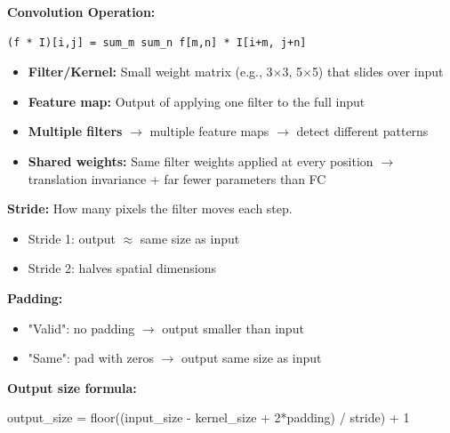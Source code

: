 \documentclass[11pt]{article}
\providecommand{\tightlist}{\setlength{\itemsep}{1pt}\setlength{\parskip}{0pt}}
\newenvironment{Shaded}{\begin{snugshade}}{\end{snugshade}}
\newcommand{\DecValTok}[1]{\textcolor[rgb]{0.96,0.45,0.00}{#1}}
\newcommand{\NormalTok}[1]{\textcolor[rgb]{0.81,0.81,0.76}{#1}}
\newcommand{\OperatorTok}[1]{\textcolor[rgb]{0.81,0.81,0.76}{#1}}
\begin{document}
\textbf{Convolution Operation:}

\setcodelang{}

\begin{verbatim}
(f * I)[i,j] = sum_m sum_n f[m,n] * I[i+m, j+n]
\end{verbatim}

\begin{itemize}
\tightlist
\item
  \textbf{Filter/Kernel:} Small weight matrix (e.g., 3\(\times\)3, 5\(\times\)5) that slides over input
\item
  \textbf{Feature map:} Output of applying one filter to the full input
\item
  \textbf{Multiple filters} \(\rightarrow\) multiple feature maps \(\rightarrow\) detect different patterns
\item
  \textbf{Shared weights:} Same filter weights applied at every position \(\rightarrow\) translation invariance + far fewer parameters than FC
\end{itemize}

\textbf{Stride:} How many pixels the filter moves each step.

\begin{itemize}
\tightlist
\item
  Stride 1: output \(\approx\) same size as input
\item
  Stride 2: halves spatial dimensions
\end{itemize}

\textbf{Padding:}

\begin{itemize}
\tightlist
\item
  "Valid": no padding \(\rightarrow\) output smaller than input
\item
  "Same": pad with zeros \(\rightarrow\) output same size as input
\end{itemize}

\textbf{Output size formula:}


\begin{Shaded}
\begin{Highlighting}[]
\NormalTok{output\_size }\OperatorTok{=}\NormalTok{ floor((input\_size }\OperatorTok{{-}}\NormalTok{ kernel\_size }\OperatorTok{+} \DecValTok{2}\OperatorTok{*}\NormalTok{padding) }\OperatorTok{/}\NormalTok{ stride) }\OperatorTok{+} \DecValTok{1}
\end{Highlighting}
\end{Shaded}
\end{document}
